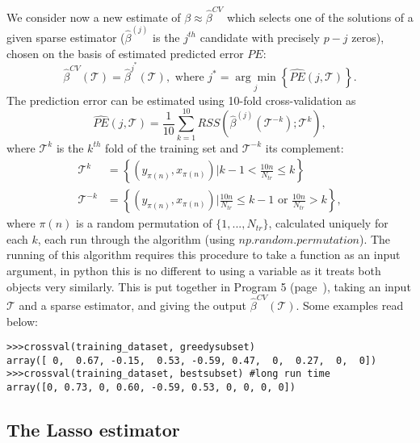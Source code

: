 \documentclass{article}
\begin{document}
We consider now a new estimate of $\beta \approx \hat{\beta}^{CV}$ which selects one of the solutions of a given sparse estimator ($\hat{\beta}^{(j)}$ is the $j^{th}$ candidate with precisely $p-j$ zeros), chosen on the basis of estimated predicted error $\hat{PE}$:
\begin{equation*}
\hat{\beta}^{CV}(\mathcal{T})=\hat{\beta}^{j^*}(\mathcal{T}), \text{ where } j^* = \underset{j}{\arg\min} \left\{ \hat{PE}(j,\mathcal{T}) \right \}.
\end{equation*} 
The prediction error can be estimated using 10-fold cross-validation as
\begin{equation*}
\hat{PE}(j,\mathcal{T}) = \frac{1}{10} \sum_{k=1}^{10} RSS \left ( \hat{\beta}^{(j)}(\mathcal{T}^{-k}); \mathcal{T}^k \right ),
\end{equation*}
where $\mathcal{T}^k$ is the $k^{th}$ fold of the training set and $\mathcal{T}^{-k}$ its complement:
\begin{equation*}
\begin{split}
\mathcal{T}^k &= \left \{ (y_{\pi(n)},x_{\pi(n)}) | k-1 < \frac{10n}{N_{tr}} \leq k \right \} \\
\mathcal{T}^{-k} &= \left \{ (y_{\pi(n)},x_{\pi(n)}) | \frac{10n}{N_{tr}} \leq k-1 \text{ or } \frac{10n}{N_{tr}} > k \right \},
\end{split}
\end{equation*}
where $\pi(n)$ is a random permutation of $\{1,...,N_{tr} \}$, calculated uniquely for each $k$, each run through the algorithm (using $\textit{np.random.permutation}$). The running of this algorithm requires this procedure to take a function as an input argument, in python this is no different to using a variable as it treats both objects very similarly. This is put together in Program 5 (page~\pageref{subsec:Program 5}), taking an input $\mathcal{T}$ and a sparse estimator, and giving the output $\hat{\beta}^{CV}(\mathcal{T})$. Some examples read below:

\begin{lstlisting}
>>>crossval(training_dataset, greedysubset)
array([ 0,  0.67, -0.15,  0.53, -0.59, 0.47,  0,  0.27,  0,  0])
>>>crossval(training_dataset, bestsubset) #long run time
array([0, 0.73, 0, 0.60, -0.59, 0.53, 0, 0, 0, 0])
\end{lstlisting}

\vspace{-0.5cm}
\subsection{The Lasso estimator}
\vspace{-0.5cm}
\end{document}
